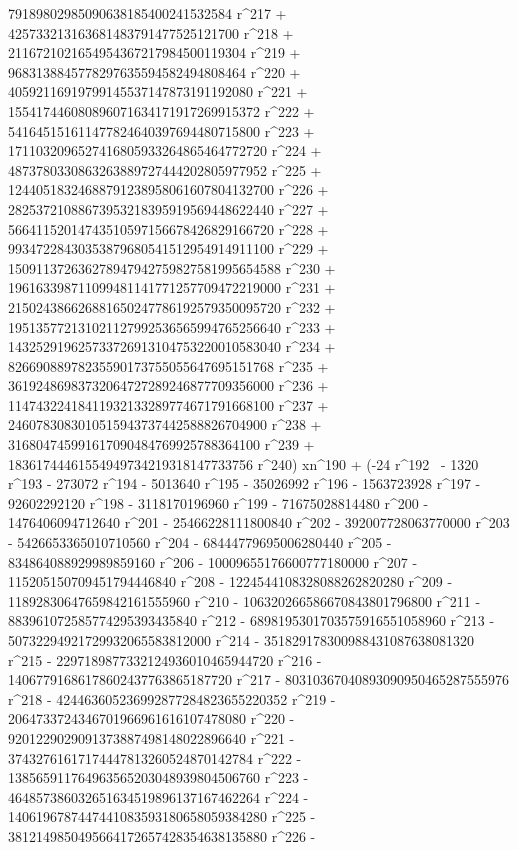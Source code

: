        79189802985090638185400241532584 r^217 + 
       425733213163681483791477525121700 r^218 + 
       2116721021654954367217984500119304 r^219 + 
       9683138845778297635594582494808464 r^220 + 
       40592116919799145537147873191192080 r^221 + 
       155417446080896071634171917269915372 r^222 + 
       541645151611477824640397694480715800 r^223 + 
       1711032096527416805933264865464772720 r^224 + 
       4873780330863263889727444202805977952 r^225 + 
       12440518324688791238958061607804132700 r^226 + 
       28253721088673953218395919569448622440 r^227 + 
       56641152014743510597156678426829166720 r^228 + 
       99347228430353879680541512954914911100 r^229 + 
       150911372636278947942759827581995654588 r^230 + 
       196163398711099481141771257709472219000 r^231 + 
       215024386626881650247786192579350095720 r^232 + 
       195135772131021127992536565994765256640 r^233 + 
       143252919625733726913104753220010583040 r^234 + 
       82669088978235590173755055647695151768 r^235 + 
       36192486983732064727289246877709356000 r^236 + 
       11474322418411932133289774671791668100 r^237 + 
       2460783083010515943737442588826704900 r^238 + 
       316804745991617090484769925788364100 r^239 + 
       18361744461554949734219318147733756 r^240) xn^190 + (-24 r^192 \
- 1320 r^193 - 273072 r^194 - 5013640 r^195 - 35026992 r^196 - 
       1563723928 r^197 - 92602292120 r^198 - 3118170196960 r^199 - 
       71675028814480 r^200 - 1476406094712640 r^201 - 
       25466228111800840 r^202 - 392007728063770000 r^203 - 
       5426653365010710560 r^204 - 68444779695006280440 r^205 - 
       834864088929989859160 r^206 - 10009655176600777180000 r^207 - 
       115205150709451794446840 r^208 - 
       1224544108328088262820280 r^209 - 
       11892830647659842161555960 r^210 - 
       106320266586670843801796800 r^211 - 
       883961072585774295393435840 r^212 - 
       6898195301703575916551058960 r^213 - 
       50732294921729932065583812000 r^214 - 
       351829178300988431087638081320 r^215 - 
       2297189877332124936010465944720 r^216 - 
       14067791686178602437763865187720 r^217 - 
       80310367040893090950465287555976 r^218 - 
       424463605236992877284823655220352 r^219 - 
       2064733724346701966961616107478080 r^220 - 
       9201229029091373887498148022896640 r^221 - 
       37432761617174447813260524870142784 r^222 - 
       138565911764963565203048939804506760 r^223 - 
       464857386032651634519896137167462264 r^224 - 
       1406196787447441083593180658059384280 r^225 - 
       3812149850495664172657428354638135880 r^226 - 
